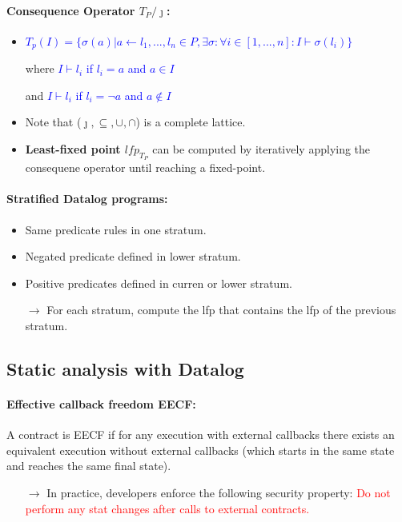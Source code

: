 \paragraph{Consequence Operator $T_P / \jmath$:}
\begin{itemize}
    \item \textcolor{blue}{$T_p(I) = \{\sigma(a) | a \xleftarrow{} l_1,...,l_n \in P, \exists \sigma : \forall i \in [1,...,n]: I \vdash \sigma(l_i)\}$}
    \item[] where \textcolor{blue}{$I \vdash l_i$ if $l_i = a$ and $a \in I$}
    \item[] and \textcolor{blue}{$I \vdash l_i$ if $l_i = \neg a$ and $a \notin I$}
    \item Note that ($\jmath, \subseteq, \cup, \cap$) is a complete lattice.
    \item \textbf{Least-fixed point $lfp_{T_P}$} can be computed by iteratively applying the consequene operator until reaching a fixed-point.
\end{itemize}{}

\paragraph{Stratified Datalog programs:}
\begin{itemize}
    \item Same predicate rules in one stratum.
    \item Negated predicate defined in lower stratum.
    \item Positive predicates defined in curren or lower stratum.
    \item[$\xrightarrow{}$] For each stratum, compute the lfp that contains the lfp of the previous stratum.
\end{itemize}{}

\begin{minipage}{0.5\linewidth}
    \centering      
    \def\svgwidth{\linewidth}
        
\end{minipage} 

\subsection{Static analysis with Datalog}

\paragraph{Effective callback freedom EECF:} A contract is EECF if for any execution with external callbacks there exists an equivalent execution without external callbacks (which starts in the same state and reaches the same final state).
\begin{itemize}
    \item[$\xrightarrow{}$] In practice, developers enforce the following security property: \textcolor{red}{Do not perform any stat changes after calls to external contracts.}
\end{itemize}{}

